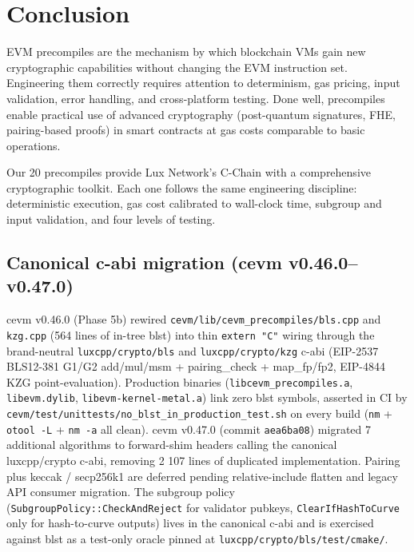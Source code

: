 \section{Conclusion}


EVM precompiles are the mechanism by which blockchain VMs gain new cryptographic
capabilities without changing the EVM instruction set. Engineering them correctly requires
attention to determinism, gas pricing, input validation, error handling, and
cross-platform testing. Done well, precompiles enable practical use of advanced
cryptography (post-quantum signatures, FHE, pairing-based proofs) in smart contracts
at gas costs comparable to basic operations.

Our 20 precompiles provide Lux Network's C-Chain with a comprehensive cryptographic
toolkit. Each one follows the same engineering discipline: deterministic execution,
gas cost calibrated to wall-clock time, subgroup and input validation, and four levels
of testing.

\subsection*{Canonical c-abi migration (cevm v0.46.0--v0.47.0)}

cevm v0.46.0 (Phase 5b) rewired \texttt{cevm/lib/cevm\_precompiles/bls.cpp}
and \texttt{kzg.cpp} (564 lines of in-tree blst) into thin
\texttt{extern "C"} wiring through the brand-neutral
\texttt{luxcpp/crypto/bls} and \texttt{luxcpp/crypto/kzg} c-abi
(EIP-2537 BLS12-381 G1/G2 add/mul/msm + pairing\_check + map\_fp/fp2,
EIP-4844 KZG point-evaluation). Production binaries
(\texttt{libcevm\_precompiles.a}, \texttt{libevm.dylib},
\texttt{libevm-kernel-metal.a}) link zero blst symbols, asserted in
CI by \texttt{cevm/test/unittests/no\_blst\_in\_production\_test.sh}
on every build (\texttt{nm} + \texttt{otool -L} + \texttt{nm -a} all
clean). cevm v0.47.0 (commit \texttt{aea6ba08}) migrated 7 additional
algorithms to forward-shim headers calling the canonical luxcpp/crypto
c-abi, removing 2 107 lines of duplicated implementation. Pairing
plus keccak / secp256k1 are deferred pending relative-include flatten
and legacy API consumer migration. The subgroup policy
(\texttt{SubgroupPolicy::CheckAndReject} for validator pubkeys,
\texttt{ClearIfHashToCurve} only for hash-to-curve outputs) lives in
the canonical c-abi and is exercised against blst as a test-only
oracle pinned at \texttt{luxcpp/crypto/bls/test/cmake/}.

